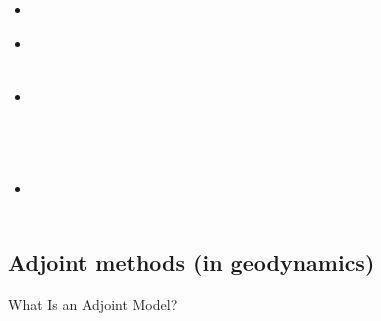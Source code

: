 \begin{scriptsize}
\begin{itemize}
\textcite{bocf16} \\
\textcite{yagu16} \\
\textcite{baum16} \\
\textcite{pric16} \\
\item[\twothousandseventeen] 
\textcite{zhli17} \\
\item[\twothousandeighteen] 
\textcite{bofc18} \\
\textcite{shyp18} \\
\item[\twothousandtwenty] 
\textcite{lufs20} \\
\textcite{ruml20} \\
\textcite{orza20} \\
\textcite{moku20} \\
\item[\twothousandtwentyone] 
\textcite{mabh21} \\
\textcite{reub21} \\
\end{itemize}
\end{scriptsize}


\subsection{Adjoint methods (in geodynamics)}

What Is an Adjoint Model? \cite{erri97}

